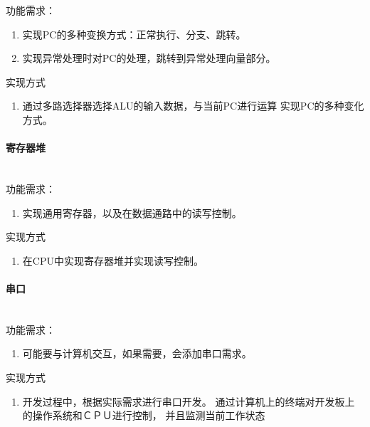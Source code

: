                 功能需求：
                \begin{enumerate}
                \item
                实现PC的多种变换方式：正常执行、分支、跳转。
                \item
                实现异常处理时对PC的处理，跳转到异常处理向量部分。
                \end{enumerate}

                实现方式
                \begin{enumerate}
                \item
                通过多路选择器选择ALU的输入数据，与当前PC进行运算%
                实现PC的多种变化方式。
                \end{enumerate}

            \paragraph{寄存器堆}
                \mbox{} \\ 

                功能需求：
                \begin{enumerate}
                \item
                实现通用寄存器，以及在数据通路中的读写控制。
                \end{enumerate}

                实现方式
                \begin{enumerate}
                \item
                在CPU中实现寄存器堆并实现读写控制。
                \end{enumerate}

            \paragraph{串口}
                \mbox{} \\

                功能需求：
                \begin{enumerate}
                \item
                可能要与计算机交互，如果需要，会添加串口需求。
                \end{enumerate}

                实现方式
                \begin{enumerate}
                \item
                开发过程中，根据实际需求进行串口开发。
                通过计算机上的终端对开发板上的操作系统和ＣＰＵ进行控制，
                并且监测当前工作状态
                \end{enumerate}
